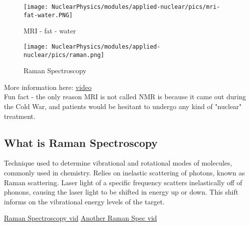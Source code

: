             \begin{figure}[H]
    			\centering
    			\texttt{[image: NuclearPhysics/modules/applied-nuclear/pics/mri-fat-water.PNG]}
    			\caption{MRI - fat - water}
    		\end{figure}
    		
    		 \begin{figure}[H]
    			\centering
    			\texttt{[image: NuclearPhysics/modules/applied-nuclear/pics/raman.png]}
    			\caption{Raman Spectroscopy}
    		\end{figure}
            
            More information here: \href{https://www.youtube.com/watch?v=djAxjtN_7VE}{video}\\
            Fun fact - the only reason MRI is not called NMR is because it came out during the Cold War, and patients would be hesitant to undergo any kind of "nuclear" treatment. 


        
        \subsection{What is Raman Spectroscopy}
            \indent Technique used to determine vibrational and rotational modes of molecules, commonly used in chemistry. Relies on inelastic scattering of photons, known as Raman scattering. Laser light of a specific frequency scatters inelastically off of phonons, causing the laser light to be shifted in energy up or down. This shift informs on the vibrational energy levels of the target.
            
            \href{https://www.youtube.com/watch?v=Gok7jRuer1k}{Raman Spectroscopy vid}
            \href{ttps://www.youtube.com/watch?v=_dPzIQEVEtc}{Another Raman Spec vid}
